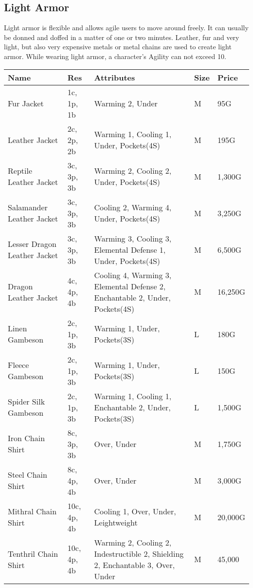 \subsection{Light Armor}\label{subsec:lightArmor}

Light armor is flexible and allows agile users to move around freely.
It can usually be donned and doffed in a matter of one or two minutes.
Leather, fur and very light, but also very expensive metals or metal chains are used to create light armor.
While wearing light armor, a character's Agility can not exceed 10.

\begin{longtable}{p{3.5cm} | p{1.5cm} | p{5cm} | p{1cm} | p{1.25cm}}
	Name & Res &  Attributes & Size & Price\\ \hline
	Fur Jacket & 1c, 1p, 1b & Warming 2, Under & M & 95G\\
	
	Leather Jacket & 2c, 2p, 2b & Warming 1, Cooling 1, Under, Pockets(4S)  & M & 195G\\
	
	Reptile Leather Jacket & 3c, 3p, 3b & Warming 2, Cooling 2, Under, Pockets(4S) & M & 1,300G\\
	
	Salamander Leather Jacket & 3c, 3p, 3b & Cooling 2, Warming 4, Under, Pockets(4S) & M & 3,250G\\
	
	Lesser Dragon Leather Jacket & 3c, 3p, 3b & Warming 3, Cooling 3, Elemental Defense 1, Under, Pockets(4S) & M & 6,500G\\
	
	Dragon Leather Jacket & 4c, 4p, 4b & Cooling 4, Warming 3, Elemental Defense 2, Enchantable 2, Under, Pockets(4S) & M & 16,250G\\
	
	Linen Gambeson & 2c, 1p, 3b & Warming 1, Under, Pockets(3S) & L & 180G\\
	
	Fleece Gambeson & 2c, 1p, 3b & Warming 1, Under, Pockets(3S) & L & 150G\\
	
	Spider Silk Gambeson & 2c, 1p, 3b & Warming 1, Cooling 1, Enchantable 2, Under, Pockets(3S) & L & 1,500G\\
	
	Iron Chain Shirt & 8c, 3p, 3b & Over, Under & M & 1,750G\\
	
	Steel Chain Shirt & 8c, 4p, 4b & Over, Under & M & 3,000G\\
	
	Mithral Chain Shirt & 10c, 4p, 4b & Cooling 1, Over, Under, Leightweight & M & 20,000G\\
	
	Tenthril Chain Shirt & 10c, 4p, 4b & Warming 2, Cooling 2, Indestructible 2, Shielding 2, Enchantable 3, Over, Under & M & 45,000\\
\end{longtable}